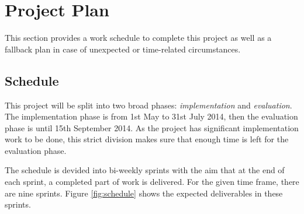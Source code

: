 \chapter{Project Plan}

This section provides a work schedule to complete this project as well as a fallback plan in case of unexpected or time-related circumstances.

\section{Schedule}

This project will be split into two broad phases: \emph{implementation} and \emph{evaluation}. The implementation phase is from 1st May to 31st July 2014, then the evaluation phase is until 15th September 2014. As the project has significant implementation work to be done, this strict division makes sure that enough time is left for the evaluation phase.

The schedule is devided into bi-weekly sprints with the aim that at the end of each sprint, a completed part of work is delivered. For the given time frame, there are nine sprints. Figure \ref{fig:schedule} shows the expected deliverables in these sprints.

